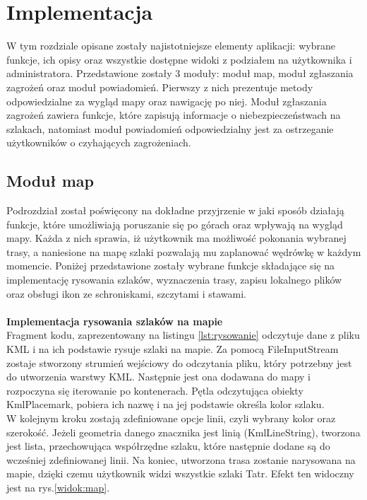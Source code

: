 \section{Implementacja}
W tym rozdziale opisane zostały najistotniejsze elementy aplikacji: wybrane funkcje, ich opisy oraz wszystkie dostępne widoki z podziałem na użytkownika i administratora. 
Przedstawione zostały 3 moduły: moduł map, moduł zgłaszania zagrożeń oraz moduł powiadomień. Pierwszy z nich prezentuje metody odpowiedzialne za wygląd mapy oraz nawigację po niej. Moduł zgłaszania zagrożeń zawiera funkcje, które zapisują informacje o niebezpieczeństwach na szlakach, natomiast moduł powiadomień odpowiedzialny jest za ostrzeganie użytkowników o czyhających zagrożeniach.
\subsection{Moduł map}
Podrozdział został poświęcony na dokładne przyjrzenie w jaki sposób działają funkcje, które umożliwiają poruszanie się po górach oraz wpływają na wygląd mapy. Każda z nich sprawia, iż użytkownik ma możliwość pokonania wybranej trasy, a naniesione na mapę szlaki pozwalają mu zaplanować wędrówkę w każdym momencie. Poniżej przedstawione zostały wybrane funkcje składające się na implementację rysowania szlaków, wyznaczenia trasy, zapisu lokalnego plików oraz obsługi ikon ze schroniskami, szczytami i stawami.
\\ 
\\
\textbf{Implementacja rysowania szlaków na mapie} \\
\indent Fragment kodu, zaprezentowany na listingu \ref{lst:rysowanie} odczytuje dane z pliku KML i na ich podstawie rysuje szlaki na mapie. Za pomocą FileInputStream zostaje stworzony strumień wejściowy do odczytania pliku, który potrzebny jest do utworzenia warstwy KML. Następnie jest ona dodawana do mapy i rozpoczyna się iterowanie po kontenerach. Pętla odczytująca obiekty KmlPlacemark, pobiera ich nazwę i na jej podstawie określa kolor szlaku. \\W kolejnym kroku zostają zdefiniowane opcje linii, czyli wybrany kolor oraz szerokość. Jeżeli geometria danego znacznika jest linią (KmlLineString), tworzona jest lista, przechowująca współrzędne szlaku, które następnie dodane są do wcześniej zdefiniowanej linii. Na koniec, utworzona trasa zostanie narysowana na mapie, dzięki czemu użytkownik widzi wszystkie szlaki Tatr. Efekt ten widoczny jest na rys.\ref{widok:map}.\\

